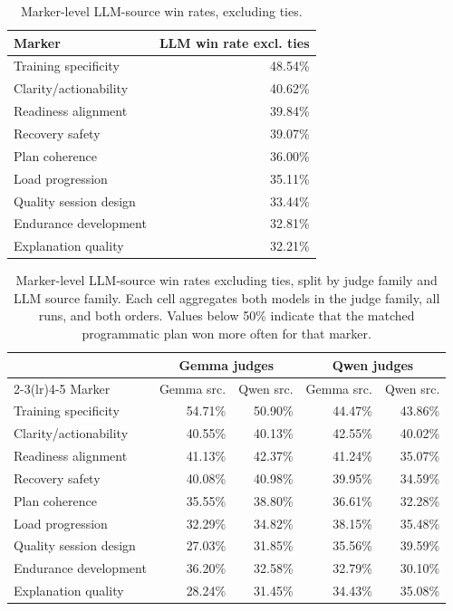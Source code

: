 \documentclass[11pt]{article}
\begin{document}
\begin{table}[H]
\centering
\small
\begin{tabular}{lr}
\toprule
Marker & LLM win rate excl. ties \\
\midrule
Training specificity & 48.54\% \\
Clarity/actionability & 40.62\% \\
Readiness alignment & 39.84\% \\
Recovery safety & 39.07\% \\
Plan coherence & 36.00\% \\
Load progression & 35.11\% \\
Quality session design & 33.44\% \\
Endurance development & 32.81\% \\
Explanation quality & 32.21\% \\
\bottomrule
\end{tabular}
\caption{Marker-level LLM-source win rates, excluding ties.}
\label{tab:markers}
\end{table}

\begin{table}[H]
\centering
\small
\setlength{\tabcolsep}{4.5pt}
\begin{tabular}{lrrrr}
\toprule
& \multicolumn{2}{c}{Gemma judges} & \multicolumn{2}{c}{Qwen judges} \\
\cmidrule(lr){2-3}\cmidrule(lr){4-5}
Marker & Gemma src. & Qwen src. & Gemma src. & Qwen src. \\
\midrule
Training specificity & 54.71\% & 50.90\% & 44.47\% & 43.86\% \\
Clarity/actionability & 40.55\% & 40.13\% & 42.55\% & 40.02\% \\
Readiness alignment & 41.13\% & 42.37\% & 41.24\% & 35.07\% \\
Recovery safety & 40.08\% & 40.98\% & 39.95\% & 34.59\% \\
Plan coherence & 35.55\% & 38.80\% & 36.61\% & 32.28\% \\
Load progression & 32.29\% & 34.82\% & 38.15\% & 35.48\% \\
Quality session design & 27.03\% & 31.85\% & 35.56\% & 39.59\% \\
Endurance development & 36.20\% & 32.58\% & 32.79\% & 30.10\% \\
Explanation quality & 28.24\% & 31.45\% & 34.43\% & 35.08\% \\
\bottomrule
\end{tabular}
\caption{Marker-level LLM-source win rates excluding ties, split by judge family and LLM source family. Each cell aggregates both models in the judge family, all runs, and both orders. Values below 50\% indicate that the matched programmatic plan won more often for that marker.}
\label{tab:marker-family}
\end{table}
\end{document}
